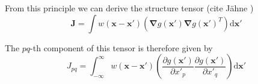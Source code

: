 		

		From this principle we can derive the structure tensor (cite Jähne )
		\begin{equation} 
			\mathbf{J} = \int w(\mathbf{x} - \mathbf{x'}) 
								\left( 
									\mathbf{\nabla}g(\mathbf{x'}) \mathbf{\nabla}g(\mathbf{x'})^T
								\right)
								\text{d}\mathbf{x'}
		\end{equation}
		
		The $pq$-th component of this tensor is therefore given by
		\begin{equation}
			J_{pq} = \int_{-\infty}^{\infty} w(\mathbf{x} - \mathbf{x'}) 
							\left(
								\dfrac{\partial g(\mathbf{x'})}{\partial x'_p} \dfrac{\partial g(\mathbf{x'})}{\partial x'_q}
							\right)
							\text{d} \mathbf{x'}
			\label{eq:struct_tensor_pq}
		\end{equation}
		
